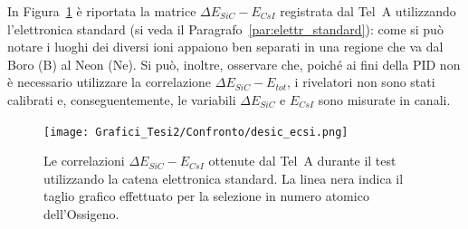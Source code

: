 
In Figura~\ref{fig:sic_csi_standard} è riportata la matrice $\Delta E_{SiC} - E_{CsI}$ registrata dal Tel~A utilizzando l'elettronica standard (si veda il Paragrafo~\ref{par:elettr_standard}): come si può notare i luoghi dei diversi ioni appaiono ben separati in una regione che va dal Boro (B) al Neon (Ne).
Si può, inoltre, osservare che, poiché ai fini della PID non è necessario utilizzare la correlazione $\Delta E_{SiC} - E_{tot}$, i rivelatori non sono stati calibrati e, conseguentemente, le variabili $\Delta E_{SiC}$ e $E_{CsI}$ sono misurate in canali.


\begin{figure} [!p]
	\centering
	\texttt{[image: Grafici\_Tesi2/Confronto/desic\_ecsi.png]}
	\caption{Le correlazioni $\Delta E_{SiC} - E_{CsI}$ ottenute dal Tel~A durante il test utilizzando la catena elettronica standard. La linea nera indica il taglio grafico effettuato per la selezione in numero atomico dell'Ossigeno.} \label{fig:sic_csi_standard}
\end{figure}








